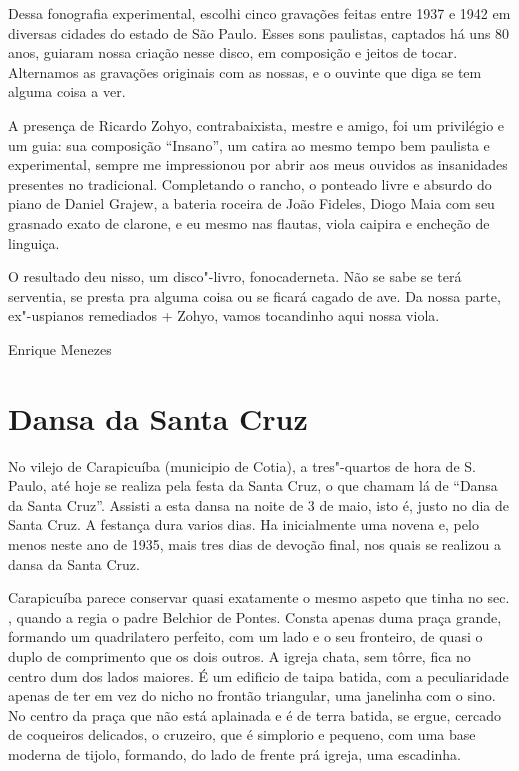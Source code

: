 Dessa fonografia experimental, escolhi cinco gravações feitas entre 1937
e 1942 em diversas cidades do estado de São Paulo. Esses sons paulistas,
captados há uns 80 anos, guiaram nossa criação nesse disco, em
composição e jeitos de tocar. Alternamos as gravações originais com as
nossas, e o ouvinte que diga se tem alguma coisa a ver.

A presença de Ricardo Zohyo, contrabaixista, mestre e amigo, foi um
privilégio e um guia: sua composição ``Insano'', um catira ao mesmo
tempo bem paulista e experimental, sempre me impressionou por abrir aos
meus ouvidos as insanidades presentes no tradicional. Completando o
rancho, o ponteado livre e absurdo do piano de Daniel Grajew, a bateria
roceira de João Fideles, Diogo Maia com seu grasnado exato de clarone, e
eu mesmo nas flautas, viola caipira e encheção de linguiça.

O resultado deu nisso, um disco"-livro, fonocaderneta. Não se sabe se
terá serventia, se presta pra alguma coisa ou se ficará cagado de ave.
Da nossa parte, ex"-uspianos remediados + Zohyo, vamos tocandinho aqui
nossa viola.

\begin{flushright}
\vfill
Enrique Menezes
\end{flushright}

\chapter{Dansa da Santa Cruz}

No vilejo de Carapicuíba (municipio de Cotia), a tres"-quartos de hora de
S. Paulo, até hoje se realiza pela festa da Santa Cruz, o que chamam lá
de ``Dansa da Santa Cruz''. Assisti a esta dansa na noite de 3 de maio,
isto é, justo no dia de Santa Cruz. A festança dura varios dias. Ha
inicialmente uma novena e, pelo menos neste ano de 1935, mais tres dias
de devoção final, nos quais se realizou a dansa da Santa Cruz.

Carapicuíba parece conservar quasi exatamente o mesmo aspeto que tinha
no sec. , quando a regia o padre Belchior de Pontes. Consta apenas
duma praça grande, formando um quadrilatero perfeito, com um lado e o
seu fronteiro, de quasi o duplo de comprimento que os dois outros. A
igreja chata, sem tôrre, fica no centro dum dos lados maiores. É um
edificio de taipa batida, com a peculiaridade apenas de ter em vez do
nicho no frontão triangular, uma janelinha com o sino. No centro da
praça que não está aplainada e é de terra batida, se ergue, cercado de
coqueiros delicados, o cruzeiro, que é simplorio e pequeno, com uma base
moderna de tijolo, formando, do lado de frente prá igreja, uma
escadinha.

